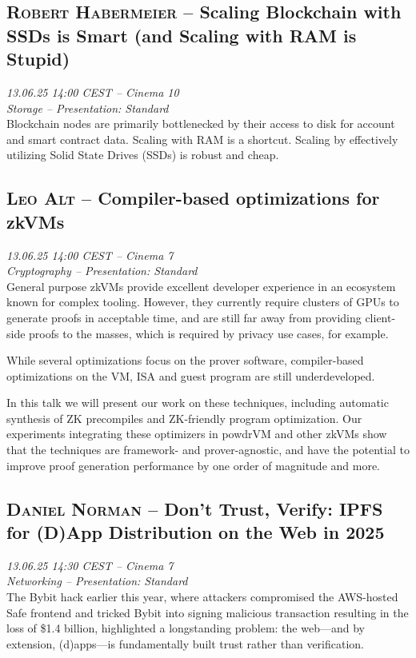 \clearpage
\subsection {\textsc{Robert Habermeier}  -- Scaling Blockchain with SSDs is Smart (and Scaling with RAM is Stupid)} \noindent \textit {13.06.25 14:00 CEST -- Cinema 10\\ Storage -- Presentation: Standard}\\[1em] Blockchain nodes are primarily bottlenecked by their access to disk for account and smart contract data. Scaling with RAM is a shortcut. Scaling by effectively utilizing Solid State Drives (SSDs) is robust and cheap.

\clearpage
\subsection {\textsc{Leo Alt}  -- Compiler-based optimizations for zkVMs} \noindent \textit {13.06.25 14:00 CEST -- Cinema 7\\ Cryptography -- Presentation: Standard}\\[1em] General purpose zkVMs provide excellent developer experience in an ecosystem
known for complex tooling. However, they currently require clusters of GPUs to
generate proofs in acceptable time, and are still far away from providing client-side
proofs to the masses, which is required by privacy use cases, for example.

While several optimizations focus on the prover software, compiler-based
optimizations on the VM, ISA and guest program are still underdeveloped.

In this talk we will present our work on these techniques, including automatic
synthesis of ZK precompiles and ZK-friendly program optimization. Our
experiments integrating these optimizers in powdrVM and other zkVMs show that
the techniques are framework- and prover-agnostic, and have the potential to
improve proof generation performance by one order of magnitude and more.

\clearpage
\subsection {\textsc{Daniel Norman}  -- Don’t Trust, Verify: IPFS for (D)App Distribution on the Web in 2025} \noindent \textit {13.06.25 14:30 CEST -- Cinema 7\\ Networking -- Presentation: Standard}\\[1em] The Bybit hack earlier this year, where attackers compromised the AWS-hosted Safe frontend and tricked Bybit into signing malicious transaction resulting in the loss of \$1.4 billion, highlighted a longstanding problem: the web—and by extension, (d)apps—is fundamentally built trust rather than verification.

